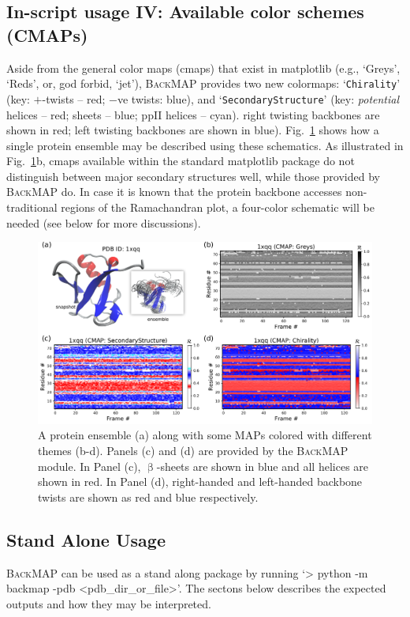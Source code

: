 \documentclass[fleqn,10pt,lineno]{wlpeerj} %
\newcommand{\Fig}[1]{Fig.~\ref{#1}}
\newcommand{\gname}{BackMAP}
\newcommand{\pname}{\textsc{\gname}\xspace}
\newcommand{\code}[1]{\texttt{#1}\xspace}
\begin{document}
\subsection*{In-script usage IV: Available color schemes (CMAPs)}
Aside from the general color maps (cmaps) that exist in matplotlib (e.g., `Greys', `Reds', or, god forbid, `jet'), 
\pname provides two new colormaps: `\code{Chirality}' (key: $+$-twists -- red; $-$ve twists: blue), and `\code{SecondaryStructure}' (key: {\it potential} helices -- red; sheets -- blue; ppII helices -- cyan). right twisting backbones are shown in red; left twisting backbones are shown in blue). \Fig{fig:cmaps} shows how a single protein ensemble
may be described using these schematics. As illustrated in \Fig{fig:cmaps}b, cmaps available within the standard matplotlib package do not distinguish between major secondary structures well, while those provided by \pname do. In case it is known that the protein backbone accesses non-traditional regions of the Ramachandran plot, a four-color schematic will be needed (see below for more discussions).

\begin{figure}[h!]
\centering
\includegraphics[width=0.9\linewidth]{backmap_fig9.pdf}
\caption{A protein ensemble (a) along with some MAPs colored with different themes (b-d). Panels (c) and (d) are provided by the \pname module. In Panel (c), $\upbeta$-sheets are shown in blue and all helices are shown in red. In Panel (d), right-handed and left-handed backbone twists are shown as red and blue respectively.\label{fig:cmaps}} 
\end{figure}

\subsection*{Stand Alone Usage}

\pname can be used as a stand along package by running `> python -m backmap -pdb <pdb\_dir\_or\_file>'. The sectons below describes the expected outputs and how they may be interpreted.
\end{document}

